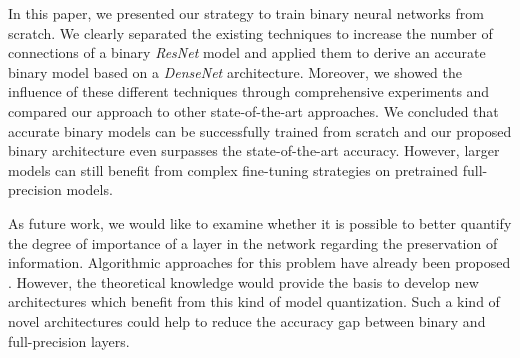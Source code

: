 \documentclass[10pt,twocolumn,letterpaper]{article}
\newcommand{\arch}[1]{\emph{#1}}
\begin{document}
In this paper, we presented our strategy to train binary neural networks from scratch.
We clearly separated the existing techniques to increase the number of connections of a binary \arch{ResNet} model and applied them to derive an accurate binary model based on a \arch{DenseNet} architecture.
Moreover, we showed the influence of these different techniques through comprehensive experiments and compared our approach to other state-of-the-art approaches.
We concluded that accurate binary models can be successfully trained from scratch and our proposed binary architecture even surpasses the state-of-the-art accuracy.
However, larger models can still benefit from complex fine-tuning strategies on pretrained full-precision models.

As future work, we would like to examine whether it is possible to better quantify the degree of importance of a layer in the network regarding the preservation of information.
Algorithmic approaches for this problem have already been proposed \cite{zhou2018adaptive}.
However, the theoretical knowledge would provide the basis to develop new architectures which benefit from this kind of model quantization.
Such a kind of novel architectures could help to reduce the accuracy gap between binary and full-precision layers.


{\small


}
\end{document}
